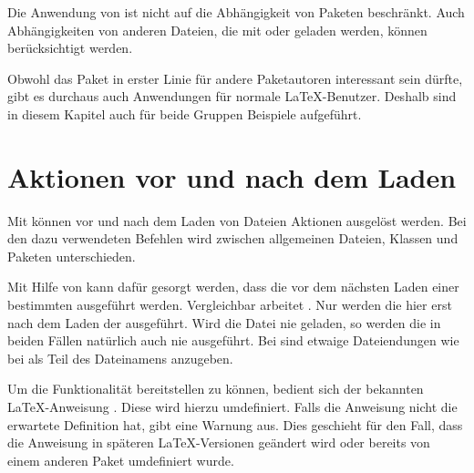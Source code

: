 Die Anwendung von  ist nicht auf die Abhängigkeit von
Paketen beschränkt. Auch Abhängigkeiten von anderen Dateien, die mit
 oder  geladen werden, können
berücksichtigt werden.%
\iffalse%
So kann beispielsweise dafür gesorgt werden, dass das nicht unkritische Laden
einer Datei wie \File{french.ldf} automatisch zu einer Warnung führt.%
\fi

Obwohl das Paket in erster Linie für andere Paketautoren interessant sein
dürfte, gibt es durchaus auch Anwendungen für normale \LaTeX-Benutzer. Deshalb
sind in diesem Kapitel auch für beide Gruppen Beispiele aufgeführt.


\section{Aktionen vor und nach dem Laden}

Mit  können vor und nach dem Laden von Dateien Aktionen
ausgelöst werden. Bei den dazu verwendeten Befehlen wird zwischen allgemeinen
Dateien, Klassen und Paketen unterschieden.


\begin{Declaration}
\end{Declaration}%
Mit Hilfe von  kann dafür gesorgt werden, dass die
 vor dem nächsten Laden einer bestimmten 
ausgeführt werden. Vergleichbar arbeitet . Nur werden die
 hier erst nach dem Laden der 
ausgeführt. Wird die Datei nie geladen, so werden die  in
beiden Fällen natürlich auch nie ausgeführt. Bei  sind etwaige
Dateiendungen wie bei  als Teil des Dateinamens anzugeben.

Um die Funktionalität bereitstellen zu können, bedient sich 
der bekannten \LaTeX-Anweisung
. Diese wird hierzu umdefiniert.
Falls die Anweisung nicht die erwartete Definition hat, gibt
 eine Warnung aus.  Dies geschieht für den Fall, dass die
Anweisung in späteren \LaTeX-Versionen geändert wird oder bereits von einem
anderen Paket umdefiniert wurde.
  
